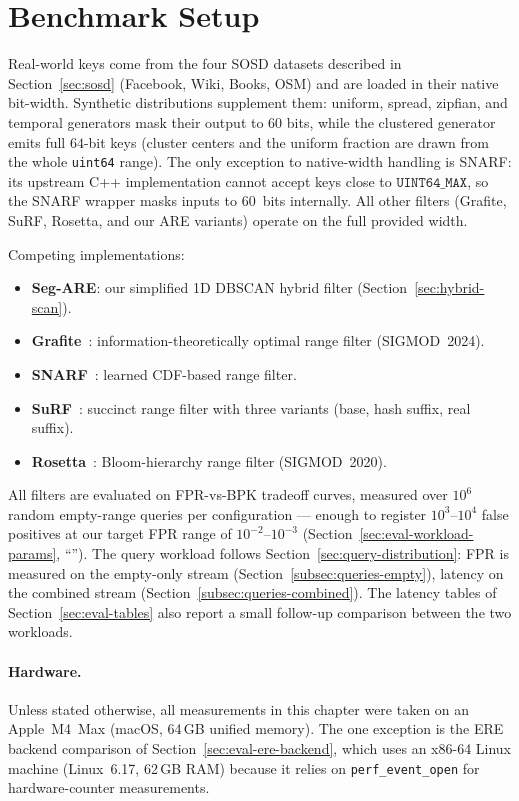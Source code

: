 \section{Benchmark Setup}
\label{sec:eval-setup}

Real-world keys come from the four SOSD datasets described in
Section~\ref{sec:sosd} (Facebook, Wiki, Books, OSM) and are
loaded in their native bit-width.
Synthetic distributions supplement them: uniform, spread, zipfian,
and temporal generators mask their output to $60$ bits, while the
clustered generator emits full $64$-bit keys (cluster centers and
the uniform fraction are drawn from the whole \texttt{uint64} range).
The only exception to native-width handling is SNARF: its upstream
C++ implementation cannot accept keys close to $\texttt{UINT64\_MAX}$,
so the SNARF wrapper masks inputs to $60$~bits internally. All other
filters (Grafite, SuRF, Rosetta, and our ARE variants) operate on the
full provided width.

Competing implementations:
\begin{itemize}
    \item \textbf{Seg-ARE}: our simplified 1D DBSCAN hybrid filter (Section~\ref{sec:hybrid-scan}).
    \item \textbf{Grafite}~\citep{grafite2024}: information-theoretically optimal
    range filter (SIGMOD~2024).
    \item \textbf{SNARF}~\citep{vaidya2022snarf}: learned CDF-based range filter.
    \item \textbf{SuRF}~\citep{zhang2018surf}: succinct range filter with three variants
    (base, hash suffix, real suffix).
    \item \textbf{Rosetta}~\citep{luo2020rosetta}: Bloom-hierarchy range filter (SIGMOD~2020).
\end{itemize}

All filters are evaluated on FPR-vs-BPK tradeoff curves, measured over $10^6$
random empty-range queries per configuration --- enough to register
$10^3$--$10^4$ false positives at our target FPR range of $10^{-2}$--$10^{-3}$
(Section~\ref{sec:eval-workload-params}, ``'').
The query workload follows Section~\ref{sec:query-distribution}:
FPR is measured on the empty-only stream
(Section~\ref{subsec:queries-empty}), latency on the combined
stream (Section~\ref{subsec:queries-combined}). The latency tables
of Section~\ref{sec:eval-tables} also report a small follow-up
comparison between the two workloads.

\paragraph{Hardware.}
Unless stated otherwise, all measurements in this chapter were taken
on an Apple~M4~Max (macOS, 64\,GB unified memory).
The one exception is the ERE backend comparison of Section~\ref{sec:eval-ere-backend},
which uses an x86-64 Linux machine (Linux~6.17, 62\,GB RAM) because it relies on
\texttt{perf\_event\_open} for hardware-counter measurements.

